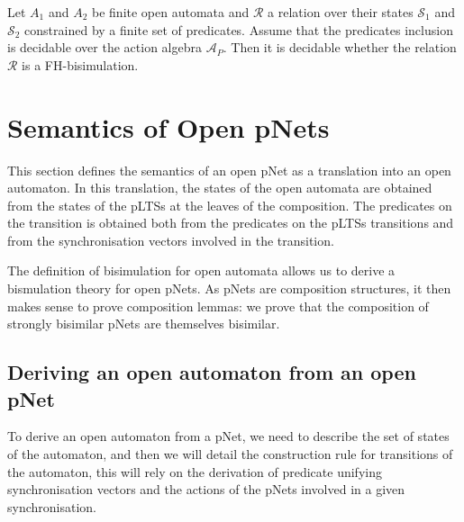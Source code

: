 \documentclass{lncs/llncs}
\begin{document}
\begin{theorem}
Let $A_1$ and $A_2$ be finite open automata
and $\mathcal{R}$ a relation over their states $\mathcal{S}_1$ and
$\mathcal{S}_2$ constrained by a finite set of predicates. Assume that
the predicates inclusion is decidable over  
the action algebra $\mathcal{A}_P$. Then it is decidable whether the relation 
$\mathcal{R}$ is a FH-bisimulation.
  
\end{theorem}



\section{Semantics of Open pNets}
\label{section:op-semantics}

This section defines the semantics of an open pNet as a translation into an open automaton. 
In this translation, the states of the open automata are obtained from the states of the pLTSs at the leaves of the composition. The predicates on the transition is obtained both from the predicates on the pLTSs transitions and from the synchronisation vectors involved in the transition.


The definition of bisimulation for open automata allows us to derive a bismulation theory for open pNets. As pNets are composition structures, it then makes sense to prove composition lemmas: we prove that the composition of strongly bisimilar pNets are themselves bisimilar.

\subsection{Deriving an open automaton from an open pNet}
To derive an open automaton from a pNet, we need to describe the set of states of the automaton, and then we will detail the construction rule for transitions of the automaton, this will rely on the derivation of predicate unifying synchronisation vectors and the actions of the pNets involved in a given synchronisation.

\end{document}
